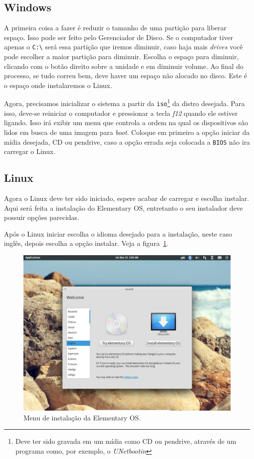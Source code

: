 \documentclass{handout_utfpr}
\begin{document}
\subsection{Windows}
A primeira coisa a fazer é reduzir o tamanho de uma partição para liberar espaço. Isso pode ser feito pelo Gerenciador de Disco. Se o computador tiver apenas o \texttt{C:\textbackslash} será essa partição que iremos diminuir, caso haja mais \emph{drives} você pode escolher a maior partição para diminuir. Escolha o espaço para diminuir, clicando com o botão direito sobre a unidade e em diminuir volume. Ao final do processo, se tudo correu bem, deve haver um espaço não alocado no disco. Este é o espaço onde instalaremos o Linux.

Agora, precisamos inicializar o sistema a partir da \texttt{iso}\footnote{Deve ter sido gravada em um mídia como CD ou pendrive, através de um programa como, por exemplo, o \emph{UNetbootin}} da distro desejada. Para isso, deve-se reiniciar o computador e pressionar a tecla \emph{f12} quando ele estiver ligando. Isso irá exibir um menu que controla a ordem na qual os dispositivos são lidos em busca de uma imagem para \textit{boot}. Coloque em primeiro a opção iniciar da mídia desejada, CD ou pendrive, caso a opção errada seja colocada a \texttt{BIOS} não ira carregar o Linux.

\subsection{Linux}
Agora o Linux deve ter sido iniciado, espere acabar de carregar e escolha instalar. Aqui será feita a instalação do Elementary OS, entretanto o seu instalador deve possuir opções parecidas.

Após o Linux iniciar escolha o idioma desejado para a instalação, neste caso inglês, depois escolha a opção instalar. Veja a figura~\ref{fig:elementary-menu}.

\begin{figure}[H]
  \centering
  \includegraphics[scale=.3]{imagens/elementary-install-01.png}
  \caption{Menu de instalação da Elementary OS\@.}
  \label{fig:elementary-menu}
\end{figure}
\end{document}
